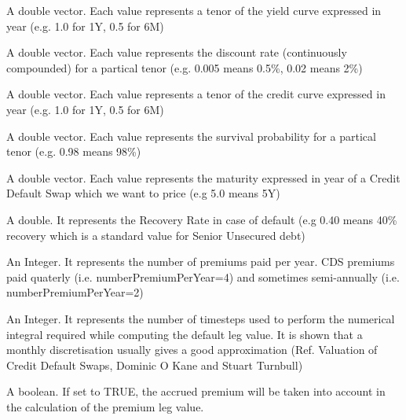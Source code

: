 \documentclass[a4paper]{book}
\begin{document}
\begin{Arguments}
\begin{ldescription}
\item[\code{yieldcurveTenor}] 
A double vector. Each value represents a tenor of the yield curve expressed in year (e.g. 1.0 for 1Y, 0.5 for 6M)

\item[\code{yieldcurveRate}] 
A double vector. Each value represents the discount rate (continuously compounded) for a partical tenor (e.g. 0.005 means 0.5\%, 0.02 means 2\%)

\item[\code{creditcurveTenor}] 
A double vector. Each value represents a tenor of the credit curve expressed in year (e.g. 1.0 for 1Y, 0.5 for 6M)

\item[\code{creditcurveSP}] 
A double vector. Each value represents the survival probability for a partical tenor (e.g. 0.98 means 98\%)

\item[\code{cdsTenors}] 
A double vector. Each value represents the maturity expressed in year of a Credit Default Swap which we want to price (e.g 5.0 means 5Y)

\item[\code{recoveryRate}] 
A double. It represents the Recovery Rate in case of default (e.g 0.40 means 40\% recovery which is a standard value for Senior Unsecured debt)

\item[\code{numberPremiumPerYear}] 
An Integer. It represents the number of premiums paid per year. CDS premiums paid quaterly (i.e. numberPremiumPerYear=4) and sometimes semi-annually (i.e. numberPremiumPerYear=2)
	
\item[\code{numberDefaultIntervalPerYear}] 
An Integer. It represents the number of timesteps used to perform the numerical integral required while computing the default leg value. It is shown that a monthly discretisation usually gives a good approximation (Ref. Valuation of Credit Default Swaps, Dominic O Kane and Stuart Turnbull)
	
\item[\code{accruedPremium}] 
A boolean. If set to TRUE, the accrued premium will be taken into account in the calculation of the premium leg value.
	
\end{ldescription}
\end{Arguments}
\end{document}
